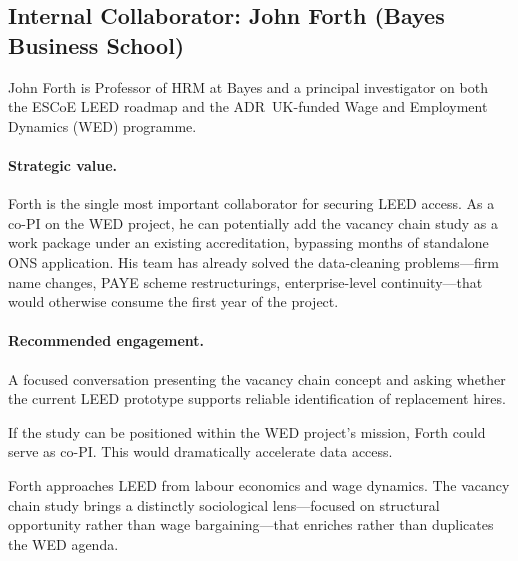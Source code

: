 \documentclass[a4paper]{tufte-handout}
\begin{document}
\subsection{Internal Collaborator: John Forth (Bayes Business School)}


John Forth is Professor of HRM at Bayes and a principal investigator on both the ESCoE LEED roadmap and the ADR~UK-funded Wage and Employment Dynamics (WED) programme.

\paragraph{Strategic value.}
Forth is the single most important collaborator for securing LEED access. As a co-PI on the WED project, he can potentially add the vacancy chain study as a work package under an existing accreditation, bypassing months of standalone ONS application. His team has already solved the data-cleaning problems---firm name changes, PAYE scheme restructurings, enterprise-level continuity---that would otherwise consume the first year of the project.

\paragraph{Recommended engagement.}

\begin{description}[style=nextline, font=\normalfont\itshape]
	\item[Initial meeting]
	      A focused conversation presenting the vacancy chain concept and asking whether the current LEED prototype supports reliable identification of replacement hires.
	\item[Co-investigator status]
	      If the study can be positioned within the WED project's mission, Forth could serve as co-PI\@. This would dramatically accelerate data access.
	\item[Complementary expertise]
	      Forth approaches LEED from labour economics and wage dynamics. The vacancy chain study brings a distinctly sociological lens---focused on structural opportunity rather than wage bargaining---that enriches rather than duplicates the WED agenda.
\end{description}
\end{document}
